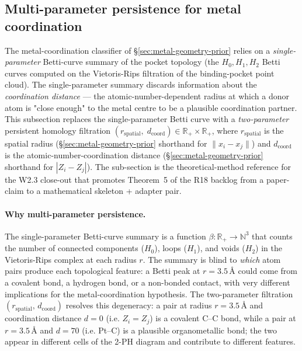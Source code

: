 \subsection{Multi-parameter persistence for metal coordination}
\label{sec:method:multi-ph}

The metal-coordination classifier of \S\ref{sec:metal-geometry-prior}
relies on a \emph{single-parameter} Betti-curve summary of the
pocket topology (the $H_0, H_1, H_2$ Betti curves computed on the
Vietoris-Rips filtration of the binding-pocket point cloud).  The
single-parameter summary discards information about the
\emph{coordination distance} --- the atomic-number-dependent radius
at which a donor atom is "close enough" to the metal centre to be a
plausible coordination partner.  This subsection replaces the
single-parameter Betti curve with a \emph{two-parameter} persistent
homology filtration
$(r_{\mathrm{spatial}},\; d_{\mathrm{coord}}) \in \mathbb{R}_{+}
\times \mathbb{R}_{+}$, where $r_{\mathrm{spatial}}$ is the spatial
radius (\S\ref{sec:metal-geometry-prior} shorthand for
$\|x_i - x_j\|$) and $d_{\mathrm{coord}}$ is the
atomic-number-coordination distance
(\S\ref{sec:metal-geometry-prior} shorthand for
$|Z_i - Z_j|$).  The sub-section is the theoretical-method reference
for the W2.3 close-out that promotes Theorem~5 of the R18 backlog
from a paper-claim to a mathematical skeleton + adapter pair.

\paragraph{Why multi-parameter persistence.}
The single-parameter Betti-curve summary is a function $\beta :
\mathbb{R}_{+} \to \mathbb{N}^{3}$ that counts the number of
connected components ($H_0$), loops ($H_1$), and voids ($H_2$) in the
Vietoris-Rips complex at each radius $r$.  The summary is blind to
\emph{which} atom pairs produce each topological feature: a Betti
peak at $r = 3.5$\,\AA{} could come from a covalent bond, a
hydrogen bond, or a non-bonded contact, with very different
implications for the metal-coordination hypothesis.  The two-parameter
filtration $(r_{\mathrm{spatial}},\, d_{\mathrm{coord}})$ resolves
this degeneracy: a pair at radius $r = 3.5$\,\AA{} and coordination
distance $d = 0$ (i.e. $Z_i = Z_j$) is a covalent C--C bond, while
a pair at $r = 3.5$\,\AA{} and $d = 70$ (i.e. Pt--C) is a
plausible organometallic bond; the two appear in different cells of
the 2-PH diagram and contribute to different features.

